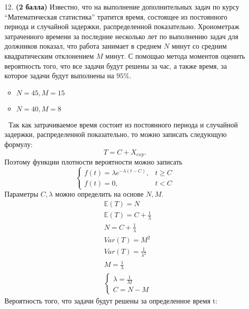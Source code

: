 \documentclass{assignment}
\begin{document}
\begin{enumerate}
    \item[12.] \textbf{(2 балла)} Известно, что на выполнение дополнительных задач по курсу ``Математическая статистика'' тратится время, состоящее из постоянного периода и случайной задержки, распределенной показательно. Хронометраж затраченного времени за последние несколько лет по выполнению задач для должников показал, что работа занимает в среднем $N$ минут со средним квадратическим отклонением $M$ минут. С помощью метода моментов оценить вероятность того, что все задачи будут решены за час, а также время, за которое задачи будут выполнены на $95\%$. 
    \begin{itemize}
        \item $N = 45, M = 15$
        \item $N = 40, M = 8$
    \end{itemize}
    \textcolor{white}{.}
    \start
    Так как затрачиваемое время состоит из постоянного периода и случайной задержки, распределенной показательно, то можно записать следующую формулу:
    \begin{equation}
        T = C + X_{exp}.
    \end{equation}
    Поэтому функции плотности вероятности можно записать
    \begin{equation}
        \begin{cases}
            f(t) = \lambda e^{-\lambda (t - C)}, &t \geq C \\
            f(t) = 0, &t < C
        \end{cases}
    \end{equation}
    Параметры $C, \lambda$ можно определить на основе $N, M$.
    \begin{align*}
        &\mathbb{E}(T) = N \\
        &\mathbb{E}(T) = C + \frac{1}{\lambda} \\
        &N = C + \frac{1}{\lambda} \\
        &Var(T) = M^2 \\
        &Var(T) = \frac{1}{\lambda^2} \\
        &M = \frac{1}{\lambda} \\
        &\begin{cases}
            \lambda = \frac{1}{M} \\
            C = N - M
        \end{cases}
    \end{align*}
    Вероятность того, что задачи будут решены за определенное время t:
    \begin{align*}

\end{align*}
\end{enumerate}
\end{document}
